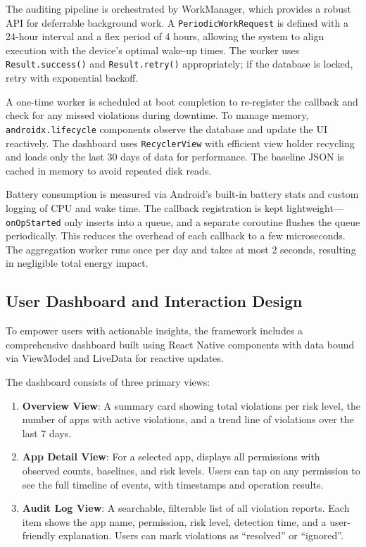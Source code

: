 The auditing pipeline is orchestrated by WorkManager, which provides a robust API for deferrable background work. A \texttt{PeriodicWorkRequest} is defined with a 24-hour interval and a flex period of 4 hours, allowing the system to align execution with the device's optimal wake-up times. The worker uses \texttt{Result.success()} and \texttt{Result.retry()} appropriately; if the database is locked, retry with exponential backoff.

A one-time worker is scheduled at boot completion to re-register the callback and check for any missed violations during downtime. To manage memory, \texttt{androidx.lifecycle} components observe the database and update the UI reactively. The dashboard uses \texttt{RecyclerView} with efficient view holder recycling and loads only the last 30 days of data for performance. The baseline JSON is cached in memory to avoid repeated disk reads.

Battery consumption is measured via Android's built-in battery stats and custom logging of CPU and wake time. The callback registration is kept lightweight—\texttt{onOpStarted} only inserts into a queue, and a separate coroutine flushes the queue periodically. This reduces the overhead of each callback to a few microseconds. The aggregation worker runs once per day and takes at most 2 seconds, resulting in negligible total energy impact.

\subsection{User Dashboard and Interaction Design}

To empower users with actionable insights, the framework includes a comprehensive dashboard built using React Native components with data bound via ViewModel and LiveData for reactive updates.

The dashboard consists of three primary views:
\begin{enumerate}
\item \textbf{Overview View}: A summary card showing total violations per risk level, the number of apps with active violations, and a trend line of violations over the last 7 days.
\item \textbf{App Detail View}: For a selected app, displays all permissions with observed counts, baselines, and risk levels. Users can tap on any permission to see the full timeline of events, with timestamps and operation results.
\item \textbf{Audit Log View}: A searchable, filterable list of all violation reports. Each item shows the app name, permission, risk level, detection time, and a user-friendly explanation. Users can mark violations as ``resolved'' or ``ignored''.
\end{enumerate}

